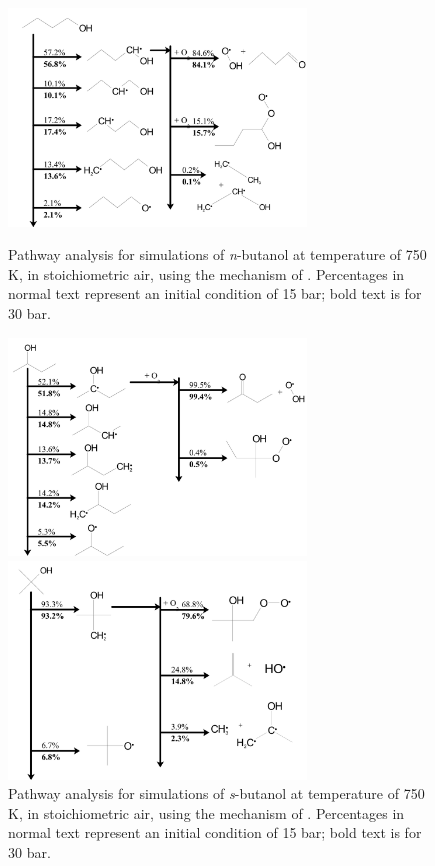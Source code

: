 \documentclass[12pt, letterpaper]{article}
\begin{document}
\begin{figure}
    \centering
    \begin{minipage}{7.9cm}
        \includegraphics[width=7.9cm]{03-Butanol/buoh-npath}
        \caption{Pathway analysis for simulations of \textit{n}-butanol at 
            temperature of 750 K, in stoichiometric air, using the mechanism of 
            \textcite{Sarathy2012}. Percentages in normal text represent an 
            initial condition of 15 bar; bold text is for 30 bar.}
        \label{fig:buoh-npath}
    \end{minipage}
    \quad
    \begin{minipage}{7.9cm}
        \includegraphics[width=7.9cm]{03-Butanol/buoh-spath}
        \caption{Pathway analysis for simulations of \textit{s}-butanol at 
            temperature of 750 K, in stoichiometric air, using the mechanism of 
            \textcite{Sarathy2012}. Percentages in normal text represent an 
            initial condition of 15 bar; bold text is for 30 bar.}
        \label{fig:buoh-spath}
    \end{minipage}
    \newline
    \begin{minipage}{7.9cm}
        \includegraphics[width=7.9cm]{03-Butanol/buoh-tpath}

\end{minipage}
\end{figure}
\end{document}
